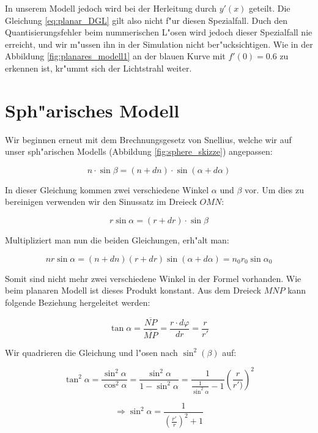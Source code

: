 \begin{refsection}
In unserem Modell jedoch wird bei der Herleitung durch $y'(x)$ geteilt.
Die Gleichung \ref{eq:planar_DGL} gilt also nicht f"ur diesen Spezialfall. 
Duch den Quantisierungsfehler beim nummerischen L"osen wird jedoch dieser Spezialfall nie erreicht, und wir m"ussen ihn in der Simulation nicht ber"ucksichtigen.
Wie in der Abbildung \ref{fig:planares_modell1} an der blauen Kurve mit $f'(0) = 0.6$ zu erkennen ist, kr"ummt sich der Lichtstrahl weiter.


\section{Sph"arisches Modell}

Wir beginnen erneut mit dem Brechnungsgesetz von Snellius, welche wir auf unser sph"arischen Modells (Abbildung \ref{fig:sphere_skizze}) angepassen: 

$$n \cdot \sin \beta = (n + dn) \cdot \sin(\alpha + d\alpha)$$

In dieser Gleichung kommen zwei verschiedene Winkel $\alpha$ und $\beta$ vor. 
Um dies zu bereinigen verwenden wir den Sinussatz im Dreieck $OMN$:

$$r \sin\alpha = (r + dr) \cdot \sin\beta$$

Multipliziert man nun die beiden Gleichungen, erh"alt man:

\begin{equation} \label{eq:sphere_base}
n r \sin \alpha = (n + dn)(r + dr) \sin (\alpha + d\alpha) = n_0 r_0 \sin \alpha_0
\end{equation}

Somit sind nicht mehr zwei verschiedene Winkel in der Formel vorhanden.
Wie beim planaren Modell ist dieses Produkt konstant.  
Aus dem Dreieck $MNP$ kann folgende Beziehung hergeleitet werden:

$$\tan \alpha =  \frac{\overline{NP}}{\overline{MP}} = \frac{r \cdot d\varphi}{dr} = \frac{r}{r'}$$

Wir quadrieren die Gleichung und l"osen nach $\sin^2(\beta)$ auf:

$$\tan^2 \alpha = \frac{\sin^2\alpha}{\cos^2\alpha} = \frac{\sin^2\alpha}{1-\sin^2\alpha} = \frac{1}{\frac{1}{\sin^2\alpha}-1} \left( \frac{r}{r')} \right)^2$$

\begin{equation} \label{eq:sphere_sine}
\Rightarrow \sin^2\alpha = \frac{1}{\left( \frac{r'}{r} \right)^2 +1}
\end{equation}


\end{refsection}
